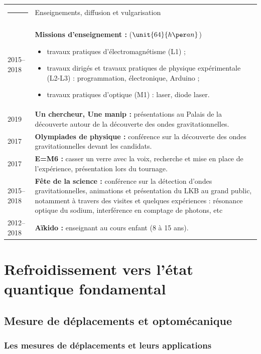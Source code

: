 \documentclass[12pt,a4paper]{article}
\begin{document}
\begin{tabular*}{\textwidth}{p{}<{\raggedleft}p{}}
\textcolor{theme}{\rule{0.12\textwidth}{2.5mm}} &
\large\textcolor{theme}{Enseignements, diffusion et vulgarisation} \vspace{3pt} \\
2015--2018 & \textbf{Missions d'enseignement :} ($\unit{64}{h\per an}$)
\begin{itemize}
\item travaux pratiques d'électromagnétisme (L1) ;
\item travaux dirigés et travaux pratiques de physique expérimentale (L2-L3) : programmation, électronique, Arduino ;
\item travaux pratiques d'optique (M1) : laser, diode laser.
\end{itemize}\\
\vspace{-8mm} 2019 &
\vspace{-8mm} \textbf{Un chercheur, Une manip :} présentations au Palais de la découverte autour de la découverte des ondes gravitationnelles.\\
2017 &
\textbf{Olympiades de physique :} conférence sur la découverte des ondes gravitationnelles devant les candidats.\\
2017 &
\textbf{E=M6 :} casser un verre avec la voix, recherche et mise en place de l'expérience, présentation lors du tournage.\\
2015--2018 &
\textbf{Fête de la science :} conférence sur la détection d'ondes gravitationnelles, animations et présentation du LKB au grand public, notamment à travers des visites et quelques expériences : résonance optique du sodium, interférence en comptage de photons, etc\\
2012--2018 &
\textbf{Aïkido :} enseignant au cours enfant (8 à 15 ans). 
\end{tabular*}

\section{Refroidissement vers l'état quantique fondamental}

\subsection{Mesure de déplacements et optomécanique}
\label{sec:intro}

\subsubsection{Les mesures de déplacements et leurs applications}
\end{document}
